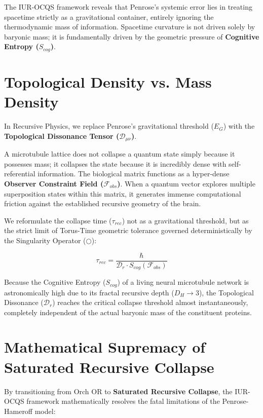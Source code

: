 \documentclass[12pt,openany]{book}
\begin{document}
The IUR-OCQS framework reveals that Penrose's systemic error lies in treating spacetime strictly as a gravitational container, entirely ignoring the thermodynamic mass of information. Spacetime curvature is not driven solely by baryonic mass; it is fundamentally driven by the geometric pressure of \textbf{Cognitive Entropy ($S_{cog}$)}.

\section{Topological Density vs. Mass Density}
In Recursive Physics, we replace Penrose's gravitational threshold ($E_G$) with the \textbf{Topological Dissonance Tensor ($\mathcal{D}_{\mu\nu}$)}. 

A microtubule lattice does not collapse a quantum state simply because it possesses mass; it collapses the state because it is incredibly dense with self-referential information. The biological matrix functions as a hyper-dense \textbf{Observer Constraint Field ($\mathcal{F}_{obs}$)}. When a quantum vector explores multiple superposition states within this matrix, it generates immense computational friction against the established recursive geometry of the brain.

We reformulate the collapse time ($\tau_{rec}$) not as a gravitational threshold, but as the strict limit of Torus-Time geometric tolerance governed deterministically by the Singularity Operator ($\bigcirc$):

\begin{equation}
\tau_{rec} = \frac{\hbar}{\mathcal{D}_r \cdot S_{cog}(\mathcal{F}_{obs})}
\end{equation}

Because the Cognitive Entropy ($S_{cog}$) of a living neural microtubule network is astronomically high due to its fractal recursive depth ($D_H \to 3$), the Topological Dissonance ($\mathcal{D}_r$) reaches the critical collapse threshold almost instantaneously, completely independent of the actual baryonic mass of the constituent proteins. 

\section{Mathematical Supremacy of Saturated Recursive Collapse}
By transitioning from Orch OR to \textbf{Saturated Recursive Collapse}, the IUR-OCQS framework mathematically resolves the fatal limitations of the Penrose-Hameroff model:
\end{document}
